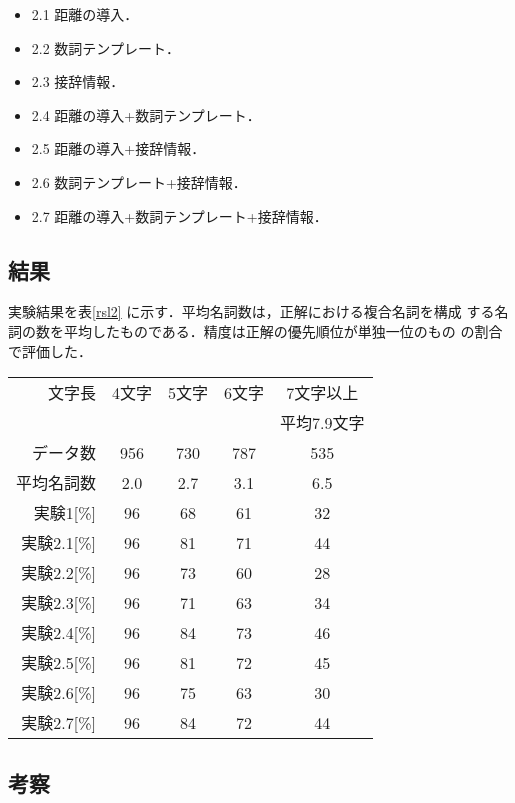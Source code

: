 \begin{itemize}
\item{2.1} 距離の導入．
\item{2.2} 数詞テンプレート．
\item{2.3} 接辞情報．
\item{2.4} 距離の導入+数詞テンプレート．
\item{2.5} 距離の導入+接辞情報．
\item{2.6} 数詞テンプレート+接辞情報．
\item{2.7} 距離の導入+数詞テンプレート+接辞情報．
\end{itemize}


\subsection{結果}

実験結果を表\ref{rsl2} に示す．平均名詞数は，正解における複合名詞を構成
する名詞の数を平均したものである．精度は正解の優先順位が単独一位のもの
の割合で評価した．

\begin{center}
  \begin{tabular}{|r|c|c|c|c|}
    \hline
    文字長 & 4文字 & 5文字 & 6文字 & 7文字以上\\
    &&&&平均7.9文字\\
    \hline
    データ数 & 956 & 730 & 787 & 535 \\
    \hline
    平均名詞数 & 2.0 & 2.7 & 3.1 & 6.5\\
    \hline
    実験1[\%] & 96 & 68 & 61 & 32 \\
    \hline
    \hline
    実験2.1[\%] & 96 & 81 & 71 & 44 \\
    \hline
    実験2.2[\%] & 96 & 73 & 60 & 28 \\
    \hline
    実験2.3[\%] & 96 & 71 & 63 & 34 \\
    \hline
    実験2.4[\%] & 96 & 84 & 73 & 46 \\
    \hline
    実験2.5[\%] & 96 & 81 & 72 & 45 \\
    \hline
    実験2.6[\%] & 96 & 75 & 63 & 30 \\
    \hline
    実験2.7[\%] & 96 & 84 & 72 & 44 \\
    \hline
  \end{tabular}
\end{center}

\subsection{考察}

